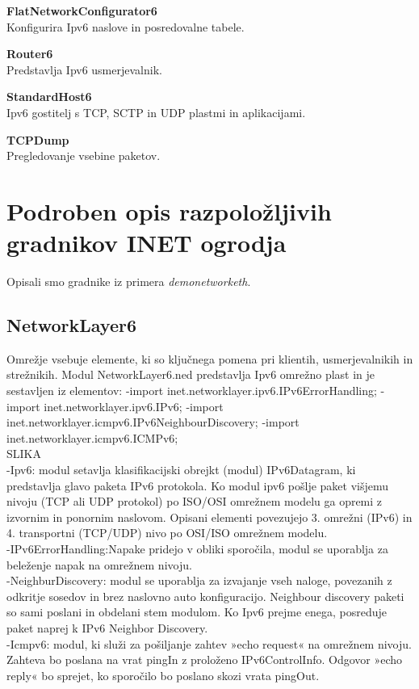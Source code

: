 \documentclass[11pt,a4paper,slovene]{myarticle}
\begin{document}
\textbf{FlatNetworkConfigurator6}\\
Konfigurira Ipv6 naslove in posredovalne tabele.

\textbf{Router6}\\
Predstavlja Ipv6 usmerjevalnik.

\textbf{StandardHost6}\\
Ipv6 gostitelj s TCP, SCTP in UDP plastmi in aplikacijami.

\textbf{TCPDump}\\
Pregledovanje vsebine paketov.

\section{Podroben opis razpoložljivih gradnikov INET ogrodja}
Opisali smo gradnike iz primera \textit{demonetworketh}.

\subsection{NetworkLayer6}
Omrežje vsebuje elemente, ki so ključnega pomena pri klientih, usmerjevalnikih in strežnikih.
Modul NetworkLayer6.ned predstavlja Ipv6 omrežno plast in  je sestavljen iz elementov:
-import inet.networklayer.ipv6.IPv6ErrorHandling;
-import inet.networklayer.ipv6.IPv6;
-import inet.networklayer.icmpv6.IPv6NeighbourDiscovery;
-import inet.networklayer.icmpv6.ICMPv6;
\\
SLIKA
\\

-Ipv6: modul setavlja klasifikacijski obrejkt (modul) IPv6Datagram, ki predstavlja glavo
paketa IPv6 protokola. Ko modul ipv6 pošlje paket višjemu nivoju (TCP ali UDP
protokol) po ISO/OSI omrežnem modelu ga opremi z izvornim in ponornim naslovom.
Opisani elementi povezujejo 3. omrežni (IPv6) in 4. transportni (TCP/UDP) nivo po
OSI/ISO omrežnem modelu.
\\
-IPv6ErrorHandling:Napake pridejo v obliki sporočila, modul se uporablja za beleženje napak na omrežnem nivoju.
\\
-NeighburDiscovery: modul se uporablja za izvajanje vseh naloge, povezanih z odkritje
sosedov in brez naslovno auto konfiguracijo. Neighbour discovery paketi so sami poslani in obdelani stem modulom. Ko Ipv6 prejme enega, posreduje paket naprej k IPv6 Neighbor Discovery.
\\
-Icmpv6: modul, ki služi za pošiljanje zahtev »echo request« na omrežnem
nivoju. Zahteva bo poslana na vrat pingIn z proloženo IPv6ControlInfo. Odgovor »echo reply« bo sprejet, ko sporočilo bo poslano skozi vrata pingOut.
\end{document}
